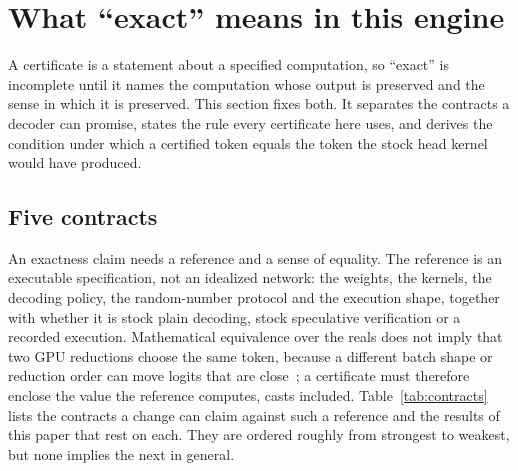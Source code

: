 \section{What ``exact'' means in this engine}\label{sec:semantics}
A certificate is a statement about a specified computation, so ``exact'' is incomplete until it names the computation whose output is preserved and the sense in which it is preserved. This section fixes both. It separates the contracts a decoder can promise, states the rule every certificate here uses, and derives the condition under which a certified token equals the token the stock head kernel would have produced.

\subsection{Five contracts}\label{sec:contracts-p1}
An exactness claim needs a reference and a sense of equality. The reference is an executable specification, not an idealized network: the weights, the kernels, the decoding policy, the random-number protocol and the execution shape, together with whether it is stock plain decoding, stock speculative verification or a recorded execution. Mathematical equivalence over the reals does not imply that two GPU reductions choose the same token, because a different batch shape or reduction order can move logits that are close~\cite{floatguide,torchnumeric}; a certificate must therefore enclose the value the reference computes, casts included. Table~\ref{tab:contracts} lists the contracts a change can claim against such a reference and the results of this paper that rest on each. They are ordered roughly from strongest to weakest, but none implies the next in general.


